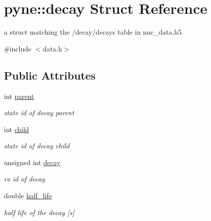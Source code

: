 \hypertarget{structpyne_1_1decay}{}\section{pyne\+:\+:decay Struct Reference}
\label{structpyne_1_1decay}


a struct matching the \textquotesingle{}/decay/decays\textquotesingle{} table in nuc\+\_\+data.\+h5.  




{\ttfamily \#include $<$data.\+h$>$}

\subsection*{Public Attributes}
\begin{DoxyCompactItemize}
\item 
\mbox{\label{structpyne_1_1decay_a49696dc372feeb09800f96d6733367f2}} 
int \hyperlink{structpyne_1_1decay_a49696dc372feeb09800f96d6733367f2}{parent}
\begin{DoxyCompactList}\small\item\em state id of decay parent \end{DoxyCompactList}\item 
\mbox{\label{structpyne_1_1decay_a945a2d85e13b6457072dcbc3f53b1d68}} 
int \hyperlink{structpyne_1_1decay_a945a2d85e13b6457072dcbc3f53b1d68}{child}
\begin{DoxyCompactList}\small\item\em state id of decay child \end{DoxyCompactList}\item 
\mbox{\label{structpyne_1_1decay_acd08ac0848d8491d1320fe538f0ed35e}} 
unsigned int \hyperlink{structpyne_1_1decay_acd08ac0848d8491d1320fe538f0ed35e}{decay}
\begin{DoxyCompactList}\small\item\em rx id of decay \end{DoxyCompactList}\item 
\mbox{\label{structpyne_1_1decay_aff2afc2b50e4e53eb60a67d2448cb889}} 
double \hyperlink{structpyne_1_1decay_aff2afc2b50e4e53eb60a67d2448cb889}{half\+\_\+life}
\begin{DoxyCompactList}\small\item\em half life of the decay \mbox{[}s\mbox{]} \end{DoxyCompactList}\item 

\end{DoxyCompactItemize}
